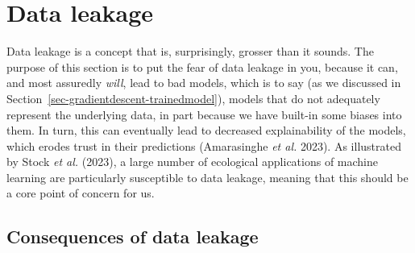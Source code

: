 \documentclass[
  letterpaper,
]{scrbook}
\begin{document}
\begin{figure}[bt]



\end{figure}%


\chapter{Data leakage}\label{sec-leakage}

Data leakage is a concept that is, surprisingly, grosser than it sounds.
The purpose of this section is to put the fear of data leakage in you,
because it can, and most assuredly \emph{will}, lead to bad models,
which is to say (as we discussed in
Section~\ref{sec-gradientdescent-trainedmodel}), models that do not
adequately represent the underlying data, in part because we have
built-in some biases into them. In turn, this can eventually lead to
decreased explainability of the models, which erodes trust in their
predictions (Amarasinghe \emph{et al.} 2023). As illustrated by Stock
\emph{et al.} (2023), a large number of ecological applications of
machine learning are particularly susceptible to data leakage, meaning
that this should be a core point of concern for us.

\section{Consequences of data leakage}\label{sec-leakage-consequences}
\end{document}
